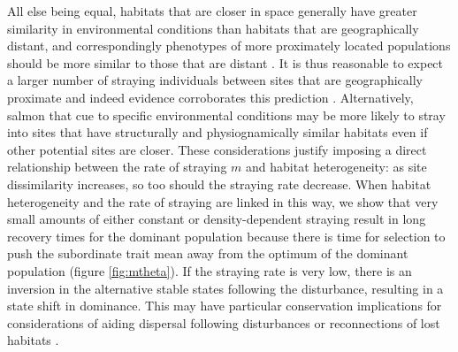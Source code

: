 \documentclass{revtex4}
\begin{document}
All else being equal, habitats that are closer in space generally have greater similarity in environmental conditions than habitats that are geographically distant, and correspondingly phenotypes of more proximately located populations should be more similar to those that are distant \citep{Westley:2012ui}.
It is thus reasonable to expect a larger number of straying individuals between sites that are geographically proximate and indeed evidence corroborates this prediction \citep{Candy:2000hu,JPE:JPE1383}.
Alternatively, salmon that cue to specific environmental conditions may be more likely to stray into sites that have structurally and physiognamically similar habitats \citep{Peterson:2014gy} even if other potential sites are closer.
These considerations justify imposing a direct relationship between the rate of straying $m$ and habitat heterogeneity: as site dissimilarity increases, so too should the straying rate decrease.
When habitat heterogeneity and the rate of straying are linked in this way, we show that very small amounts of either constant or density-dependent straying result in long recovery times for the dominant population because there is time for selection to push the subordinate trait mean away from the optimum of the dominant population (figure \ref{fig:mtheta}). %
If the straying rate is very low, there is an inversion in the alternative stable states following the disturbance, resulting in a state shift in dominance.
This may have particular conservation implications for considerations of aiding dispersal following disturbances or reconnections of lost habitats \citep{Anderson:2013bf,Pess:2014isa}.
\end{document}

